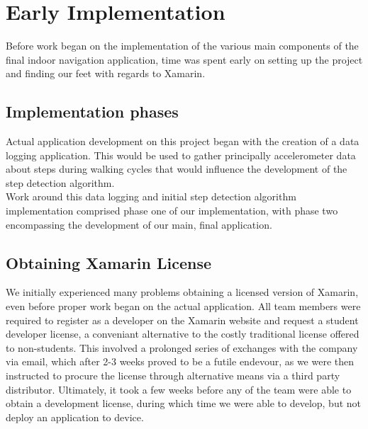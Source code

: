 \documentclass[main.tex]{subfiles}
\begin{document}
\section{Early Implementation}

Before work began on the implementation of the various main components of the final indoor navigation application, time was spent early on setting up the project and finding our feet with regards to Xamarin.

\subsection{Implementation phases}

Actual application development on this project began with the creation of a data logging application. This would be used to gather principally accelerometer data about steps during walking cycles that would influence the development of the step detection algorithm.\\

Work around this data logging and initial step detection algorithm implementation comprised phase one of our implementation, with phase two encompassing the development of our main, final application.

\subsection{Obtaining Xamarin License}

We initially experienced many problems obtaining a licensed version of Xamarin, even before proper work began on the actual application. All team members were required to register as a developer on the Xamarin website and request a student developer license, a conveniant alternative to the costly traditional license offered to non-students. This involved a prolonged series of exchanges with the company via email, which after 2-3 weeks proved to be a futile endevour, as we were then instructed to procure the license through alternative means via a third party distributor. Ultimately, it took a few weeks before any of the team were able to obtain a development license, during which time we were able to develop, but not deploy an application to device. 
\end{document}
